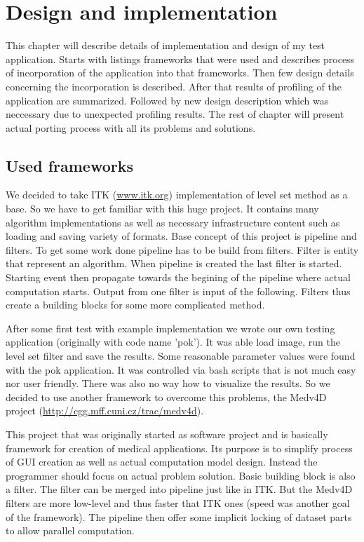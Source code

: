 \chapter{Design and implementation}

This chapter will describe details of implementation and design of my test application.
Starts with listings frameworks that were used and describes process of incorporation of the application into that frameworks.
Then few design details concerning the incorporation is described.
After that results of profiling of the application are summarized.
Followed by new design description which was neccessary due to unexpected profiling results.
The rest of chapter will present actual porting process with all its problems and solutions.

\section{Used frameworks}

\par
We decided to take ITK (\url{www.itk.org}) implementation of level set method as a base.
So we have to get familiar with this huge project.
It contains many algorithm implementations as well as necessary infrastructure content such as loading and saving variety of formats.
Base concept of this project is pipeline and filters.
To get some work done pipeline has to be build from filters.
Filter is entity that represent an algorithm.
When pipeline is created the last filter is started.
Starting event then propagate towards the begining of the pipeline where actual computation starts.
Output from one filter is input of the following.
Filters thus create a building blocks for some more complicated method.

\par
After some first test with example implementation we wrote our own testing application (originally with code name 'pok').
It was able load image, run the level set filter and save the results.
Some reasonable parameter values were found with the pok application.
It was controlled via bash scripts that is not much easy nor user friendly.
There was also no way how to visualize the results.
So we decided to use another framework to overcome this problems, the Medv4D project (\url{http://cgg.mff.cuni.cz/trac/medv4d}).

\par
This project that was originally started as software project and is basically framework for creation of medical applications.
Its purpose is to simplify process of GUI creation as well as actual computation model design.
Instead the programmer should focus on actual problem solution.
Basic building block is also a filter.
The filter can be merged into pipeline just like in ITK.
But the Medv4D filters are more low-level and thus faster that ITK ones (speed was another goal of the framework).
The pipeline then offer some implicit locking of dataset parts to allow parallel computation.


